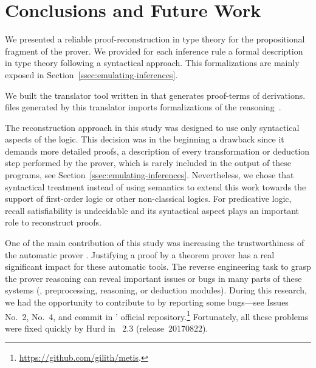 \documentclass[../main.tex]{subfiles}
\begin{document}

\section{Conclusions and Future Work}
\label{sec:conclusions}

We presented a reliable proof-reconstruction in type theory
for the propositional fragment of the \Metis prover. We provided for
each \Metis inference rule a formal description in type theory
following a syntactical approach.
This formalizations are mainly exposed in
Section~\ref{ssec:emulating-inferences}.

We built the \Athena translator tool written in \Haskell
that generates \Agda proof-terms of \Metis derivations.
\Agda files generated by this translator imports
\Agda formalizations of the \Metis reasoning~\cite{AgdaProp,AgdaMetis}.

The reconstruction approach in this study was designed to use
only syntactical aspects of the logic.
This decision was in the beginning a drawback
since it demands more detailed proofs, a
description of every transformation or deduction step performed by
the prover, which is rarely included in the output of these programs,
see Section~\ref{ssec:emulating-inferences}.
Nevertheless, we chose that syntactical treatment instead of using
semantics to extend this work towards the support of first-order logic
or other non-classical logics.
For predicative logic, recall satisfiability is undecidable and
its syntactical aspect plays an important role to reconstruct proofs.

One of the main contribution of this study was increasing the
trustworthiness of the automatic prover \Metis. Justifying a proof by
a theorem prover has a real significant impact for these automatic
tools.  The reverse engineering task to grasp the prover
reasoning can reveal important issues or bugs in many parts of these
systems (\eg, preprocessing, reasoning, or deduction modules). During
this research, we had the opportunity to contribute to \Metis by
reporting some bugs---see Issues No.~2, No.~4, and commit
 in \Metis' official
repository.\footnote{\url{https://github.com/gilith/metis}.}
Fortunately, all these problems were fixed quickly by Hurd in
\Metis~2.3 (release~20170822).
\end{document}
